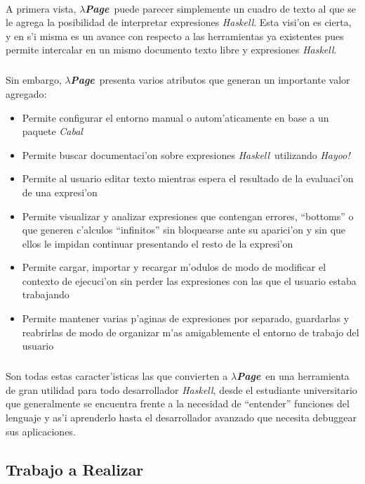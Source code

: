 \documentclass[a4paper]{article}
\newcommand{\haskell}{\textsl{Haskell}}
\newcommand{\hpage}{\textbf{\textsl{$\lambda$Page}}}
\newcommand{\cabal}{\textsl{Cabal}}
\begin{document}
\paragraph{}A primera vista, \hpage\ puede parecer simplemente un cuadro de texto al que se le agrega la posibilidad de interpretar expresiones \haskell.  Esta visi'on es cierta, y en s'i misma es un avance con respecto a las herramientas ya existentes pues permite intercalar en un mismo documento texto libre y expresiones \haskell.
\subparagraph{}Sin embargo, \hpage\ presenta varios atributos que generan un importante valor agregado:
\begin{itemize}
	\item Permite configurar el entorno manual o autom'aticamente en base a un paquete \cabal
	\item Permite buscar documentaci'on sobre expresiones \haskell\ utilizando \textsl{Hayoo!}
	\item Permite al usuario editar texto mientras espera el resultado de la evaluaci'on de una expresi'on
	\item Permite visualizar y analizar expresiones que contengan errores, ``bottoms'' o que generen c'alculos ``infinitos'' sin bloquearse ante su aparici'on y sin que ellos le impidan continuar presentando el resto de la expresi'on
	\item Permite cargar, importar y recargar m'odulos de modo de modificar el contexto de ejecuci'on sin perder las expresiones con las que el usuario estaba trabajando
	\item Permite mantener varias p'aginas de expresiones por separado, guardarlas y reabrirlas de modo de organizar m'as amigablemente el entorno de trabajo del usuario
\end{itemize}
\subparagraph{}Son todas estas caracter'isticas las que convierten a \hpage\ en una herramienta de gran utilidad para todo desarrollador \haskell, desde el estudiante universitario que generalmente se encuentra frente a la necesidad de ``entender''  funciones del lenguaje y as'i aprenderlo hasta el desarrollador avanzado que necesita debuggear sus aplicaciones.

\newpage
\subsection{Trabajo a Realizar}\label{secTaR}
\begin{epigraphs}
\end{epigraphs}
\end{document}
